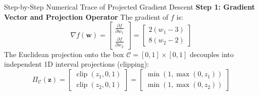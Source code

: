 \begin{examplebox}[breakable]{Step-by-Step Numerical Trace of Projected Gradient Descent}
\textbf{Step 1: Gradient Vector and Projection Operator}
The gradient of $f$ is:
\begin{equation}
\nabla f(\mathbf{w}) = \begin{bmatrix} \frac{\partial f}{\partial w_1} \\ \frac{\partial f}{\partial w_2} \end{bmatrix} = \begin{bmatrix} 2(w_1 - 3) \\ 8(w_2 - 2) \end{bmatrix}
\end{equation}
The Euclidean projection onto the box $\mathcal{C} = [0, 1] \times [0, 1]$ decouples into independent 1D interval projections (clipping):
\begin{equation}
\Pi_{\mathcal{C}}(\mathbf{z}) = \begin{bmatrix} \operatorname{clip}(z_1, 0, 1) \\ \operatorname{clip}(z_2, 0, 1) \end{bmatrix} = \begin{bmatrix} \min(1, \max(0, z_1)) \\ \min(1, \max(0, z_2)) \end{bmatrix}
\end{equation}


\end{examplebox}
